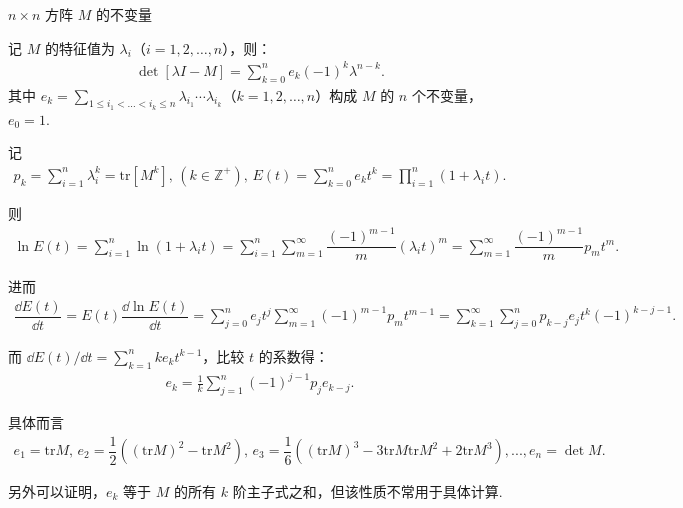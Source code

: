 \begin{note}
	\(n \times n\) 方阵 \(M\) 的不变量

	记 \(M\) 的特征值为 \(\lambda_i\)（\(i = 1, 2, \dots, n\)），则：
	\begin{align*}
		\det[\lambda I - M] = \sum_{k=0}^n e_k (-1)^k \lambda^{n-k}.
	\end{align*}
	其中 \(e_k = \sum_{1 \leq i_1 < \dots < i_k \leq n} \lambda_{i_1} \cdots \lambda_{i_k}\)（\(k = 1, 2, \dots, n\)）构成 \(M\) 的 \(n\) 个不变量，\(e_0 = 1\).

	记
	\begin{align*}
		p_k = \sum_{i=1}^n \lambda_i^k = \mathrm{tr}[M^k],\,(k \in \mathbb{Z}^+),\,E(t) = \sum_{k=0}^n e_k t^k = \prod_{i=1}^n (1 + \lambda_i t).
	\end{align*}

	则
	\begin{align*}
		\ln E(t) = \sum_{i=1}^n \ln(1 + \lambda_i t) = \sum_{i=1}^n \sum_{m=1}^\infty \dfrac{(-1)^{m-1}}{m} (\lambda_i t)^m = \sum_{m=1}^\infty \dfrac{(-1)^{m-1}}{m} p_m t^m.
	\end{align*}

	进而
	\begin{align*}
		\dfrac{\dd E(t)}{\dd t} = E(t) \dfrac{\dd \ln E(t)}{\dd t} = \sum_{j=0}^n e_j t^j \sum_{m=1}^\infty (-1)^{m-1} p_m t^{m-1} = \sum_{k=1}^\infty \sum_{j=0}^n p_{k-j} e_j t^k (-1)^{k-j-1}.
	\end{align*}

	而 \(\dd E(t)/\dd t = \sum_{k=1}^n k e_k t^{k-1}\)，比较 \(t\) 的系数得：
	\begin{align*}
		e_k = \frac{1}{k}\sum_{j=1}^n (-1)^{j-1} p_j e_{k-j}.
	\end{align*}

	具体而言
	\begin{align*}
		e_1 = \mathrm{tr}M,\,e_2 = \dfrac{1}{2}\left( (\mathrm{tr}M)^2 - \mathrm{tr}M^2 \right),\,e_3 = \dfrac{1}{6}\left( (\mathrm{tr}M)^3 - 3 \mathrm{tr}M \mathrm{tr}M^2 + 2 \mathrm{tr}M^3 \right),...,e_n = \det M.
	\end{align*}

	另外可以证明，\(e_k\) 等于 \(M\) 的所有 \(k\) 阶主子式之和，但该性质不常用于具体计算.

\end{note}

